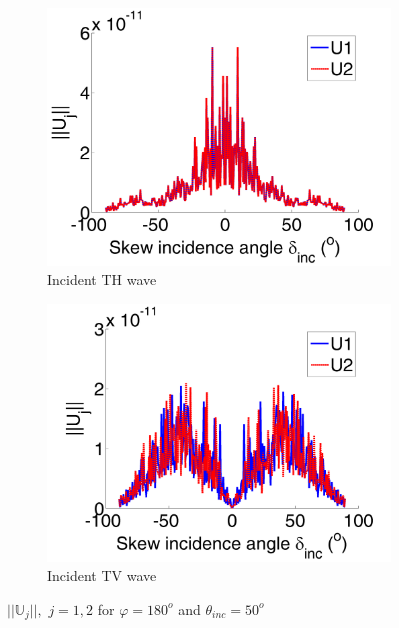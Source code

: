 \begin{figure}[h]
\centering
\begin{subfigure}[b]{0.45\textwidth}
        \includegraphics[width=\textwidth]{images/chapter4/const_reg/U1TH_180_50.png}
        \caption{Incident TH wave}
        \label{const_reg:U1TH}
    \end{subfigure}
   \begin{subfigure}[b]{0.45\textwidth}
        \includegraphics[width=\textwidth]{images/chapter4/const_reg/U1TV_180_50.png}
        \caption{Incident TV wave}
        \label{const_reg:U1TV}
    \end{subfigure} 
\caption{$||\mathbb{U}_j||, \, \, j=1,2$ for $\varphi=180^o$ and $\theta_{inc}=50^o$}
\label{const_reg:U1}
\end{figure}

